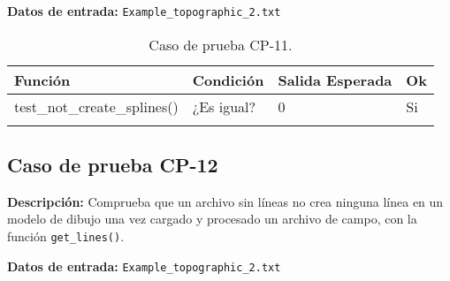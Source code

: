 \textbf{Datos de entrada:} \texttt{Example\_topographic\_2.txt}


\begin{longtable}[]{@{}llll@{}}
\toprule
\begin{minipage}[b]{0.6\columnwidth}\raggedright\strut
Función\strut
\end{minipage} & \begin{minipage}[b]{0.20\columnwidth}\raggedright\strut
Condición\strut
\end{minipage} & \begin{minipage}[b]{0.15\columnwidth}\raggedright\strut
Salida Esperada\strut
\end{minipage} & \begin{minipage}[b]{0.05\columnwidth}\raggedright\strut
Ok\strut
\end{minipage}\tabularnewline
\midrule
\endhead
\begin{minipage}[t]{0.6\columnwidth}\raggedright\strut
test\_not\_create\_splines()\strut
\end{minipage} & \begin{minipage}[t]{0.20\columnwidth}\raggedright\strut
¿Es igual?\strut
\end{minipage} & \begin{minipage}[t]{0.15\columnwidth}\raggedright\strut
0\strut
\end{minipage} & \begin{minipage}[t]{0.05\columnwidth}\raggedright\strut
Si\strut
\end{minipage}\tabularnewline

\bottomrule
\caption{Caso de prueba CP-11.}
\end{longtable}

\subsection{Caso de prueba CP-12}

\textbf{Descripción:} Comprueba que un archivo sin líneas no crea ninguna línea en un modelo de dibujo una vez cargado y procesado un archivo de campo, con la función \texttt{get\_lines()}.

\textbf{Datos de entrada:} \texttt{Example\_topographic\_2.txt}


